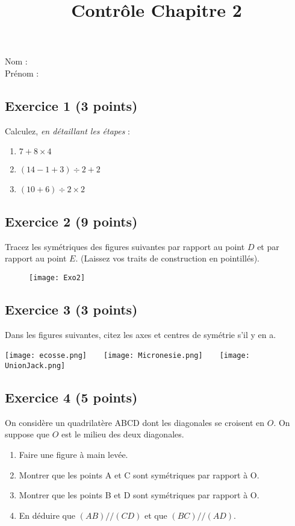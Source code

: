 \documentclass[14 pt]{extarticle}
\title{Contrôle Chapitre 2}
\date{}
\theoremstyle{plain}
\begin{document}
 Nom : \\
 Prénom : 
 \subsection*{Exercice 1 (3 points)}
 Calculez, \emph{en détaillant les étapes} : 
 \begin{enumerate}
 \item $7  + 8 \times 4$
 \item $(14 -1 + 3) \div 2 +2 $
 \item $ (10 + 6)\div 2 \times2$
 \end{enumerate}
 
 \subsection*{Exercice 2 (9 points)}
 
 Tracez les symétriques des figures suivantes par rapport au point $D$ et par rapport au point $E$. (Laissez vos traits de construction en pointillés).
 
 \begin{figure}[H]
 \center
 \texttt{[image: Exo2]}
 \end{figure}
 
 \subsection*{Exercice 3 (3 points)}
 Dans les figures suivantes, citez les axes et centres de symétrie s'il y en a. 
 
 \texttt{[image: ecosse.png]}\ \ \ \ 
 \texttt{[image: Micronesie.png]}\ \ \ \ 
 \texttt{[image: UnionJack.png]}
 \newpage
 \subsection*{Exercice 4 (5 points)}

On considère un quadrilatère ABCD dont les diagonales se croisent en $O$. On suppose que $O$ est le milieu des deux diagonales.
\begin{enumerate}
\item Faire une figure à main levée. 
\item Montrer que les points A et C sont symétriques par rapport à O. 
\item Montrer que les points B et D sont symétriques par rapport à O. 
\item En déduire que $(AB)//(CD)$ et que $(BC)//(AD)$.
\end{enumerate}



 	
\end{document}
